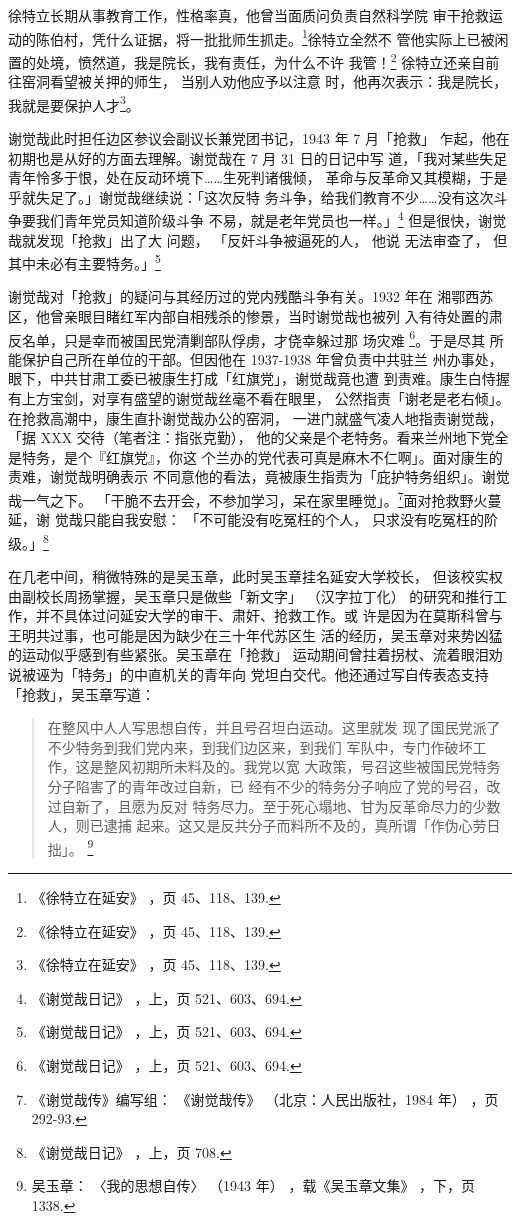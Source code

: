 徐特立长期从事教育工作，性格率真，他曾当面质问负责自然科学院
审干抢救运动的陈伯村，凭什么证据，将一批批师生抓走。\footnote{《徐特立在延安》
，页 45、118、139.}徐特立全然不
管他实际上已被闲置的处境，愤然道，我是院长，我有责任，为什么不许
我管！\footnote{《徐特立在延安》
，页 45、118、139.} 徐特立还亲自前往窑洞看望被关押的师生，
当别人劝他应予以注意
时，他再次表示：我是院长，我就是要保护人才\footnote{《徐特立在延安》
，页 45、118、139.}。

谢觉哉此时担任边区参议会副议长兼党团书记，1943 年 7 月「抢救」
乍起，他在初期也是从好的方面去理解。谢觉哉在 7 月 31 日的日记中写
道，「我对某些失足青年怜多于恨，处在反动环境下……生死判诸俄倾，
革命与反革命又其模糊，于是乎就失足了。」谢觉哉继续说：「这次反特
务斗争，给我们教育不少……没有这次斗争要我们青年党员知道阶级斗争
不易，就是老年党员也一样。」\footnote{《谢觉哉日记》
，上，页 521、603、694.} 但是很快，谢觉哉就发现「抢救」出了大
问题， 「反奸斗争被逼死的人，
他说
无法审查了，
但其中未必有主要特务。」\footnote{《谢觉哉日记》
，上，页 521、603、694.}

谢觉哉对「抢救」的疑问与其经历过的党内残酷斗争有关。1932 年在
湘鄂西苏区，他曾亲眼目睹红军内部自相残杀的惨景，当时谢觉哉也被列
入有待处置的肃反名单，只是幸而被国民党清剿部队俘虏，才侥幸躲过那
场灾难
\footnote{《谢觉哉日记》
，上，页 521、603、694.}。于是尽其
所能保护自己所在单位的干部。但因他在 1937-1938 年曾负责中共驻兰
州办事处，眼下，中共甘肃工委已被康生打成「红旗党」，谢觉哉竟也遭
到责难。康生白恃握有上方宝剑，对享有盛望的谢觉哉丝毫不看在眼里，
公然指责「谢老是老右倾」。在抢救高潮中，康生直扑谢觉哉办公的窑洞，
一进门就盛气凌人地指责谢觉哉，「据 XXX 交待（笔者注：指张克勤），
他的父亲是个老特务。看来兰州地下党全是特务，是个『红旗党』，你这
个兰办的党代表可真是麻木不仁啊」。面对康生的责难，谢觉哉明确表示
不同意他的看法，竟被康生指责为「庇护特务组织」。谢觉哉一气之下。
「干脆不去开会，不参加学习，呆在家里睡觉」。\footnote{《谢觉哉传》编写组：
《谢觉哉传》
（北京：人民出版社，1984 年）
，页 292-93.}面对抢救野火蔓延，谢
觉哉只能自我安慰：
「不可能没有吃冤枉的个人，
只求没有吃冤枉的阶级。」\footnote{《谢觉哉日记》
，上，页 708.}


在几老中间，稍微特殊的是吴玉章，此时吴玉章挂名延安大学校长，
但该校实权由副校长周扬掌握，吴玉章只是做些「新文字」
（汉字拉丁化）
的研究和推行工作，并不具体过问延安大学的审干、肃奸、抢救工作。或
许是因为在莫斯科曾与王明共过事，也可能是因为缺少在三十年代苏区生
活的经历，吴玉章对来势凶猛的运动似乎感到有些紧张。吴玉章在「抢救」
运动期间曾拄着拐杖、流着眼泪劝说被诬为「特务」的中直机关的青年向
党坦白交代。他还通过写自传表态支持「抢救」，吴玉章写道：
\begin{quote}
	\fzwkai 在整风中人人写思想自传，并且号召坦白运动。这里就发
现了国民党派了不少特务到我们党内来，到我们边区来，到我们
军队中，专门作破坏工作，这是整风初期所未料及的。我党以宽
大政策，号召这些被国民党特务分子陷害了的青年改过自新，已
经有不少的特务分子响应了党的号召，改过自新了，且愿为反对
特务尽力。至于死心塌地、甘为反革命尽力的少数人，则已逮捕
起来。这又是反共分子而料所不及的，真所谓「作伪心劳日拙」。
\footnote{吴玉章：
〈我的思想自传〉
（1943 年）
，载《吴玉章文集》
，下，页 1338.}
\end{quote}

